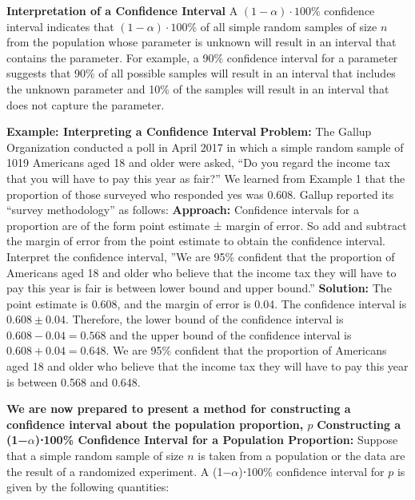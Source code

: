 \documentclass{report}
\begin{document}
    \bigbreak \noindent 
    \textbf{Interpretation of a Confidence Interval }
    \bigbreak \noindent 
    A $(1-\alpha)\cdot 100\%$ confidence interval indicates that $(1-\alpha)\cdot 100\%$ of all simple random samples of size $n$ from the population whose parameter is unknown will result in an interval that contains the parameter.
    \bigbreak \noindent 
    For example, a 90\% confidence interval for a parameter suggests that 90\% of all possible samples will result in an interval that includes the unknown parameter and 10\% of the samples will result in an interval that does not capture the parameter.
    \begin{mdframed}
      \textbf{Example: Interpreting a Confidence Interval}
      \bigbreak \noindent 
      \textbf{Problem:}
      The Gallup Organization conducted a poll in April 2017 in which a simple random sample of 1019 Americans aged 18 and older were asked, “Do you regard the income tax that you will have to pay this year as fair?” We learned from Example 1 that the proportion of those surveyed who responded yes was 0.608. Gallup reported its “survey methodology” as follows:
      \bigbreak \noindent 
      \textbf{Approach:}
      Confidence intervals for a proportion are of the form point estimate ± margin of error. So add and subtract the margin of error from the point estimate to obtain the confidence interval. Interpret the confidence interval, ”We are 95\% confident that the proportion of Americans aged 18 and older who believe that the income tax they will have to pay this year is fair is between lower bound and upper bound.”
      \bigbreak \noindent 
      \textbf{Solution:}
      \bigbreak \noindent 
      The point estimate is 0.608, and the margin of error is 0.04. The confidence interval is $0.608 \pm 0.04$. Therefore, the lower bound of the confidence interval is $0.608 - 0.04 = 0.568$ and the upper bound of the confidence interval is $0.608 + 0.04 = 0.648$. We are 95\% confident that the proportion of Americans aged 18 and older who believe that the income tax they will have to pay this year is between 0.568 and 0.648.
      \bigbreak \noindent 
    \end{mdframed}
    \bigbreak \noindent 
      \textbf{We are now prepared to present a method for constructing a confidence interval about the population proportion, $p $}
      \bigbreak \noindent 
      \textbf{Constructing a (1−$\alpha $)⋅100\% Confidence Interval for a Population Proportion:}
      \bigbreak \noindent 
      Suppose that a simple random sample of size $n $ is taken from a population or the data are the result of a randomized experiment. A (1−$\alpha $)⋅100\% confidence interval for $p $ is given by the following quantities:
\end{document}
